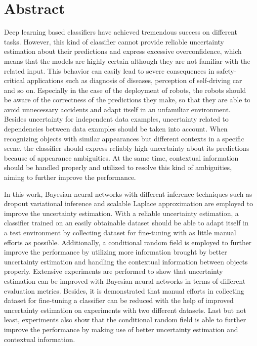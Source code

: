 
\thispagestyle{plain}

\section*{Abstract}
Deep learning based classifiers have achieved tremendous success on different tasks. However, this kind of classifier cannot provide reliable uncertainty estimation about their predictions and express excessive overconfidence, which means that the models are highly certain although they are not familiar with the related input. This behavior can easily lead to severe consequences in safety-critical applications such as diagnosis of diseases, perception of self-driving car and so on. Especially in the case of the deployment of robots, the robots should be aware of the correctness of the predictions they make, so that they are able to avoid unnecessary accidents and adapt itself in an unfamiliar environment. Besides uncertainty for independent data examples, uncertainty related to dependencies between data examples should be taken into account. When recognizing objects with similar appearances but different contexts in a specific scene, the classifier should express reliably high uncertainty about its predictions because of appearance ambiguities. At the same time, contextual information should be handled properly and utilized to resolve this kind of ambiguities, aiming to further improve the performance. 

In this work, Bayesian neural networks with different inference techniques such as dropout variational inference and scalable Laplace approximation are employed to improve the uncertainty estimation. With a reliable uncertainty estimation, a classifier trained on an easily obtainable dataset should be able to adapt itself in a test environment by collecting dataset for fine-tuning with as little manual efforts as possible. Additionally, a conditional random field is employed to further improve the performance by utilizing more information brought by better uncertainty estimation and handling the contextual information between objects properly. Extensive experiments are performed to show that uncertainty estimation can be improved with Bayesian neural networks in terms of different evaluation metrics. Besides, it is demonstrated that manual efforts in collecting dataset for fine-tuning a classifier can be reduced with the help of improved uncertainty estimation on experiments with two different datasets. Last but not least, experiments also show that the conditional random field is able to further improve the performance by making use of better uncertainty estimation and contextual information.

